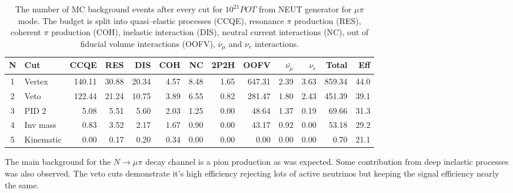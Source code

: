 \documentclass[../main.tex]{subfiles}
\begin{document}
\begin{table}[!ht]
\begin{tabular}{|c|l|r|r|r|r|r|r|r|r|r|r|r|}
  \hline
  N & Cut           &  CCQE   &  RES  &  DIS  &  COH  &  NC  &  2P2H  &  OOFV  &$\bar{\nu_{\mu}}$& $\nu_{e}$ & Total  & Eff\\
  \hline
  1 & Vertex        & 140.11  & 30.88 & 20.34 & 4.57  & 8.48 & 1.65   & 647.31 & 2.39            &  3.63     & 859.34 & 44.0 \\
  \hline
  2 & Veto          &  122.44  & 21.24 & 10.75 & 3.89  & 6.55 & 0.82   & 281.47 & 1.80            &  2.43     & 451.39 & 39.1 \\
  \hline
  3 & PID 2         & 5.08    & 5.51  & 5.60  & 2.03  & 1.25 & 0.00   & 48.64  & 1.37            &  0.19     &  69.66 & 31.3 \\
  \hline
  4 & Inv mass      & 0.83    & 3.52  & 2.17  & 1.67  & 0.90 & 0.00   & 43.17  & 0.92            &  0.00     &  53.18 & 29.2  \\
  \hline
  5 & Kinematic     & 0.00    & 0.17  & 0.20  & 0.34  & 0.00 & 0.00   & 0.00   & 0.00            &  0.00     &  0.70  & 21.1 \\
    \hline

\end{tabular}
\caption{The number of MC background events after every cut for $10^{21} POT$ from NEUT generator for $\mu\pi$ mode. The budget is split into quasi--elastic processes (CCQE), resonance $\pi$ production (RES), coherent $\pi$ production (COH), inelastic interaction (DIS), neutral current interactions (NC), out of fiducial volume interactions (OOFV), $\overline{\nu}_\mu$ and $\nu_e$ interactions.}
\label{tbl:HNL:bgOrigMu}
\end{table}

The main background for the $N\to\mu\pi$ decay channel is a pion production as was expected. Some contribution from deep inelastic processes was also observed. The veto cuts demonstrate it's high efficiency rejecting lots of active neutrinos but keeping the signal efficiency nearly the same.
\end{document}

